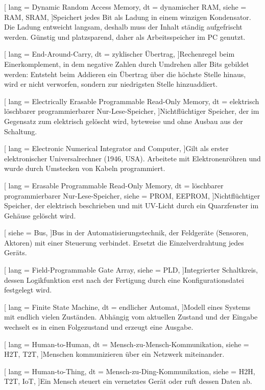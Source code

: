 [
  lang  = Dynamic Random Access Memory,
  dt    = dynamischer RAM,
  siehe = {RAM, SRAM},
]{Speichert jedes Bit als Ladung in einem winzigen Kondensator. Die Ladung entweicht langsam, deshalb muss der Inhalt ständig aufgefrischt werden. Günstig und platzsparend, daher als Arbeitsspeicher im PC genutzt.}

[
  lang  = End-Around-Carry,
  dt    = zyklischer Übertrag,
]{Rechenregel beim Einerkomplement, in dem negative Zahlen durch Umdrehen aller Bits gebildet werden: Entsteht beim Addieren ein Übertrag über die höchste Stelle hinaus, wird er nicht verworfen, sondern zur niedrigsten Stelle hinzuaddiert.}

[
  lang  = Electrically Erasable Programmable Read-Only Memory,
  dt    = elektrisch löschbarer programmierbarer Nur-Lese-Speicher,
]{Nichtflüchtiger Speicher, der im Gegensatz zum  elektrisch gelöscht wird, byteweise und ohne Ausbau aus der Schaltung.}

[
  lang  = Electronic Numerical Integrator and Computer,
]{Gilt als erster elektronischer Universalrechner (1946, USA). Arbeitete mit Elektronenröhren und wurde durch Umstecken von Kabeln programmiert.}

[
  lang  = Erasable Programmable Read-Only Memory,
  dt    = löschbarer programmierbarer Nur-Lese-Speicher,
  siehe = {PROM, EEPROM},
]{Nichtflüchtiger Speicher, der elektrisch beschrieben und mit UV-Licht durch ein Quarzfenster im Gehäuse gelöscht wird.}

[
  siehe = Bus,
]{Bus in der Automatisierungstechnik, der Feldgeräte (Sensoren, Aktoren) mit einer Steuerung verbindet. Ersetzt die Einzelverdrahtung jedes Geräts.}

[
  lang  = Field-Programmable Gate Array,
  siehe = PLD,
]{Integrierter Schaltkreis, dessen Logikfunktion erst nach der Fertigung durch eine Konfigurationsdatei festgelegt wird.}

[
  lang  = Finite State Machine,
  dt    = endlicher Automat,
]{Modell eines Systems mit endlich vielen Zuständen. Abhängig vom aktuellen Zustand und der Eingabe wechselt es in einen Folgezustand und erzeugt eine Ausgabe.}

[
  lang  = Human-to-Human,
  dt    = Mensch-zu-Mensch-Kommunikation,
  siehe = {H2T, T2T},
]{Menschen kommunizieren über ein Netzwerk miteinander.}

[
  lang  = Human-to-Thing,
  dt    = Mensch-zu-Ding-Kommunikation,
  siehe = {H2H, T2T, IoT},
]{Ein Mensch steuert ein vernetztes Gerät oder ruft dessen Daten ab.}

